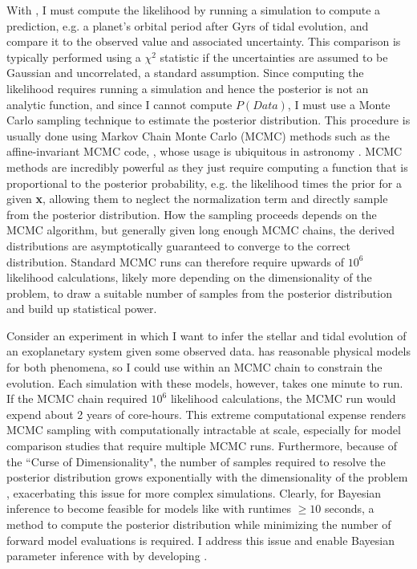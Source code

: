 With \vplanet, I must compute the likelihood by running a simulation to compute a prediction, e.g. a planet's orbital period after Gyrs of tidal evolution, and compare it to the observed value and associated uncertainty. This comparison is typically performed using a $\chi^2$ statistic if the uncertainties are assumed to be Gaussian and uncorrelated, a standard assumption. Since computing the likelihood requires running a \vplanet simulation and hence the posterior is not an analytic function, and since I cannot compute $P(Data)$, I must use a Monte Carlo sampling technique to estimate the posterior distribution. This procedure is usually done using Markov Chain Monte Carlo (MCMC) methods such as the affine-invariant MCMC code, \emcee, whose usage is ubiquitous in astronomy \citep{ForemanMackey2013}. MCMC methods are incredibly powerful as they just require computing a function that is proportional to the posterior probability, e.g. the likelihood times the prior for a given \textbf{x}, allowing them to neglect the normalization term and directly sample from the posterior distribution. How the sampling proceeds depends on the MCMC algorithm, but generally given long enough MCMC chains, the derived distributions are asymptotically guaranteed to converge to the correct distribution. Standard MCMC runs can therefore require upwards of $10^6$ likelihood calculations, likely more depending on the dimensionality of the problem, to draw a suitable number of samples from the posterior distribution and build up statistical power.  

Consider an experiment in which I want to infer the stellar and tidal evolution of an exoplanetary system given some observed data. \vplanet has reasonable physical models for both phenomena, so I could use \vplanet within an MCMC chain to constrain the evolution. Each \vplanet simulation with these models, however, takes one minute to run. If the MCMC chain required  $10^6$ likelihood calculations, the MCMC run would expend about 2 years of core-hours. This extreme computational expense renders MCMC sampling with \vplanet computationally intractable at scale, especially for model comparison studies that require multiple MCMC runs. Furthermore, because of the ``Curse of Dimensionality", the number of samples required to resolve the posterior distribution grows exponentially with the dimensionality of the problem \citep{Bellman1957}, exacerbating this issue for more complex simulations. Clearly, for Bayesian inference to become feasible for models like \vplanet with runtimes $\geq 10$ seconds, a method to compute the posterior distribution while minimizing the number of forward model evaluations is required. I address this issue and enable Bayesian parameter inference with \vplanet by developing \approxposterior \citep{FlemingVanderPlas2018}.

